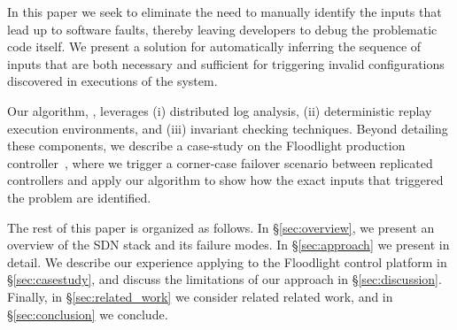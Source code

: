 In this paper we seek to eliminate the need to manually identify the inputs that lead
up to software faults, thereby leaving developers to debug the problematic code itself.
We present a solution for automatically inferring the sequence
of inputs that are both necessary and sufficient for
triggering invalid configurations discovered in executions of the system.

Our algorithm, \simulator{}, leverages (i)
distributed log analysis, (ii) deterministic replay
execution environments, and (iii) invariant checking techniques.
Beyond detailing these components, we describe a case-study
on the Floodlight production
controller~\cite{floodlight}, where we trigger a
corner-case failover scenario between replicated controllers and apply our
algorithm to show how the exact inputs that triggered the problem are
identified.


The rest of this paper is organized as follows. In \S\ref{sec:overview},
we present an overview of the SDN stack and its failure modes.
In \S\ref{sec:approach} we present \simulator{} in detail.
We describe our experience applying \simulator{} to the Floodlight
control platform in \S\ref{sec:casestudy}, and discuss the limitations of our
approach in \S\ref{sec:discussion}. Finally, in \S\ref{sec:related_work}
we consider related related work,
and in \S\ref{sec:conclusion} we conclude.


